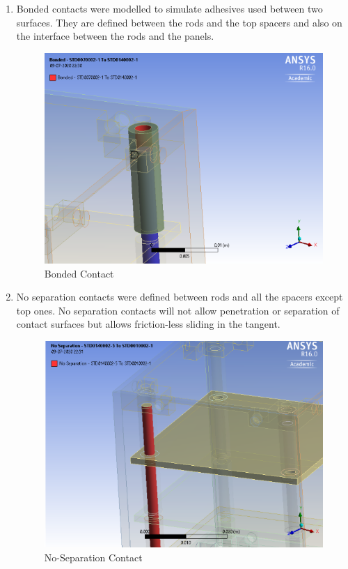 \documentclass[../../main.tex]{subfiles}
\begin{document}
    \begin{enumerate}
        
        \item Bonded contacts were modelled to simulate adhesives used between two surfaces. They are defined between the rods and the top spacers and also on the interface between the rods and the panels.
        \begin{figure}[H]
        \centering
        \includegraphics[scale=0.5]{Figures/Mechanical/bonded_contact.png}
        \caption{Bonded Contact}
        \label{fig:sys_CAD}
    \end{figure}
        \item No separation contacts were defined between rods and all the spacers except top ones. No separation contacts will not allow penetration or separation of contact surfaces but allows friction-less sliding in the tangent.
        \begin{figure}[H]
        \centering
        \includegraphics[scale=0.45]{Figures/Mechanical/nosep.png}
        \caption{No-Separation Contact}
        \label{fig:sys_CAD}
    \end{figure}
    \end{enumerate}
\end{document}
